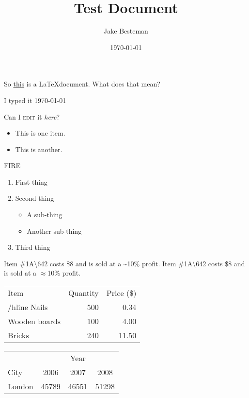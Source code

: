 \documentclass{article}
\begin{document}
\title{Test Document}
\author{Jake Besteman}
\date{\today}
\maketitle

\tableofcontents
\newpage
{}

So \underline{this} is a \LaTeX document. What does that mean?

I typed it \today

Can I \textsc{edit} it \textit{here}?

\begin{itemize}
\item This is one item.
\item This is another.
\end{itemize}
{\color{red}FIRE}


\begin{enumerate}
\item First thing
\item Second thing
\begin{itemize}
\item A sub-thing
\item Another sub-thing
\end{itemize}
\item Third thing
\end{enumerate}

Item \#1A\textbackslash642 costs \$8 and is sold at a \~{}10\% profit.
Item \#1A\textbackslash642 costs \$8 and is sold at a $\approx$10\% profit.
\newline

\begin{tabular}{l|r|r}
Item & Quantity & Price (\$) \\
/hline
Nails & 500 & 0.34 \\
Wooden boards & 100 & 4.00 \\
Bricks & 240 & 11.50 \\
\end{tabular}
\newline

\begin{tabular}{l|ccc}
 & & Year & \\
\cline{2-4}
City & 2006 & 2007 & 2008 \\
\hline
London & 45789 & 46551 & 51298 \\
\end{tabular}
\end{document}
